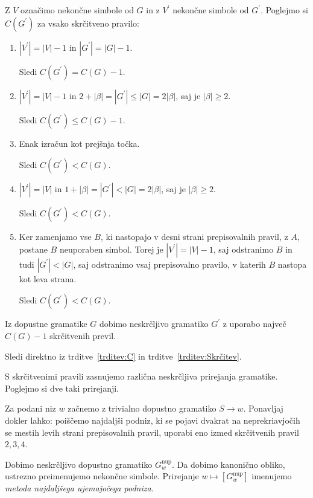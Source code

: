 \documentclass[fin1, tisk]{fmfdelo}
\providecommand{\abs}[1]{\left\lvert #1 \right\rvert}
\theoremstyle{definition}
\begin{document}
\begin{dokaz}
    Z $V$ označimo nekončne simbole od $G$ in z $V^\prime$ nekončne simbole od $G^\prime$. 
    Poglejmo si $C(G^\prime)$ za vsako skrčitveno pravilo:
    \begin{enumerate}
        \item $\abs{V^\prime} = \abs{V} -1$ in $\abs{G^\prime} = \abs{G} - 1$. 
        
        Sledi $C(G^\prime) = C(G) - 1$.
        \item $\abs{V^\prime} = \abs{V} -1$ in 
        $2 + \abs{\beta} =\abs{G^\prime} \leq \abs{G} = 2 \abs{\beta}$, saj je $\abs{\beta} \geq 2$.
        
        Sledi $C(G^\prime) \leq C(G) - 1$.
        \item Enak izračun kot prejšnja točka.

        Sledi $C(G^\prime) < C(G)$.
        \item $\abs{V^\prime} = \abs{V}$ in 
        $ 1 + \abs{\beta} = \abs{G^\prime} < \abs{G} = 2 \abs{\beta}$, saj je $\abs{\beta} \geq 2$.
        
        Sledi $C(G^\prime) < C(G)$.
        \item Ker zamenjamo vse $B$, ki nastopajo v desni strani prepisovalnih pravil, z $A$,
        postane $B$ neuporaben simbol. Torej je $\abs{V^\prime} = \abs{V} - 1$, saj odstranimo $B$
        in tudi $\abs{G^\prime} < \abs{G}$, saj odstranimo vsaj prepisovalno pravilo, v katerih
        $B$ nastopa kot leva strana.

        Sledi $C(G^\prime) < C(G)$.
    \end{enumerate}
\end{dokaz}

\begin{izrek}
    Iz dopustne gramatike $G$ dobimo neskrčljivo gramatiko $G^\prime$ z uporabo največ 
    $C(G) - 1$ skrčitvenih previl.
\end{izrek}

\begin{dokaz}
    Sledi direktno iz trditve~\ref{trditev:C} in trditve~\ref{trditev:Skrčitev}.
\end{dokaz}

S skrčitvenimi pravili zasnujemo različna neskrčljiva prirejanja gramatike. Poglejmo si dve taki
prirejanji.

\begin{definicija}
    Za podani niz $w$ začnemo z trivialno dopustno gramatiko $S \rightarrow w$. Ponavljaj dokler
    lahko: poiščemo najdaljši podniz, ki se pojavi dvakrat na neprekriavjočih se mestih levih 
    strani prepisovalnih pravil, uporabi eno izmed skrčitvenih pravil $2, 3, 4$. 
    
    Dobimo neskrčljivo dopustno gramatiko $G^\text{nup}_w$. Da dobimo kanonično obliko, ustrezno preimenujemo nekončne simbole. 
    Prirejanje $w \mapsto [G^\text{nup}_w]$ imenujemo \emph{metoda najdaljšega ujemajočega podniza}.
\end{definicija}
\end{document}
